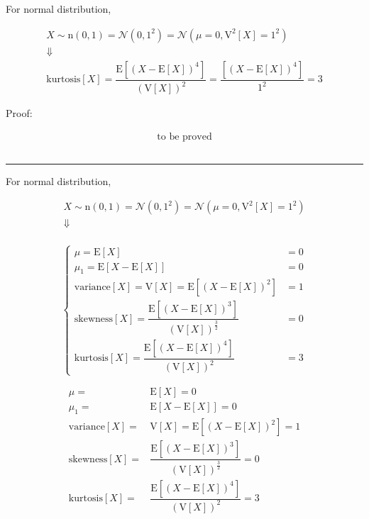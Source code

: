\documentclass[
]{book}
\theoremstyle{definition}
\theoremstyle{definition}
\theoremstyle{definition}
\theoremstyle{definition}
\theoremstyle{remark}
\begin{document}
For normal distribution,

\[
\begin{array}{c}
X\sim\mathrm{n}\left(0,1\right)=\mathcal{N}\left(0,1^{2}\right)=\mathcal{N}\left(\mu=0,\mathrm{V}^{2}\left[X\right]=1^{2}\right)\\
\Downarrow\\
\mathrm{kurtosis}\left[X\right]=\dfrac{\mathrm{E}\left[\left(X-\mathrm{E}\left[X\right]\right)^{4}\right]}{\left(\mathrm{V}\left[X\right]\right)^{2}}=\dfrac{\left[\left(X-\mathrm{E}\left[X\right]\right)^{4}\right]}{1^{2}}=3
\end{array}
\]

Proof:

\[
\begin{aligned}
\text{to be proved}
\end{aligned}
\]

\[
\tag*{$\Box$}
\]

\begin{center}\rule{0.5\linewidth}{0.5pt}\end{center}

For normal distribution,

\[
\begin{array}{c}
X\sim\mathrm{n}\left(0,1\right)=\mathcal{N}\left(0,1^{2}\right)=\mathcal{N}\left(\mu=0,\mathrm{V}^{2}\left[X\right]=1^{2}\right)\\
\Downarrow\\
\end{array}
\]

\[
\begin{cases}
\mu=\mathrm{E}\left[X\right] & =0\\
\mu_{{\scriptscriptstyle 1}}=\mathrm{E}\left[X-\mathrm{E}\left[X\right]\right] & =0\\
\mathrm{variance}\left[X\right]=\mathrm{V}\left[X\right]=\mathrm{E}\left[\left(X-\mathrm{E}\left[X\right]\right)^{2}\right] & =1\\
\mathrm{skewness}\left[X\right]=\dfrac{\mathrm{E}\left[\left(X-\mathrm{E}\left[X\right]\right)^{3}\right]}{\left(\mathrm{V}\left[X\right]\right)^{\frac{3}{2}}} & =0\\
\mathrm{kurtosis}\left[X\right]=\dfrac{\mathrm{E}\left[\left(X-\mathrm{E}\left[X\right]\right)^{4}\right]}{\left(\mathrm{V}\left[X\right]\right)^{2}} & =3
\end{cases}
\]

\[
\begin{aligned}
\mu= & \mathrm{E}\left[X\right]=0\\
\mu_{{\scriptscriptstyle 1}}= & \mathrm{E}\left[X-\mathrm{E}\left[X\right]\right]=0\\
\mathrm{variance}\left[X\right]= & \mathrm{V}\left[X\right]=\mathrm{E}\left[\left(X-\mathrm{E}\left[X\right]\right)^{2}\right]=1\\
\mathrm{skewness}\left[X\right]= & \dfrac{\mathrm{E}\left[\left(X-\mathrm{E}\left[X\right]\right)^{3}\right]}{\left(\mathrm{V}\left[X\right]\right)^{\frac{3}{2}}}=0\\
\mathrm{kurtosis}\left[X\right]= & \dfrac{\mathrm{E}\left[\left(X-\mathrm{E}\left[X\right]\right)^{4}\right]}{\left(\mathrm{V}\left[X\right]\right)^{2}}=3
\end{aligned}
\]
\end{document}
